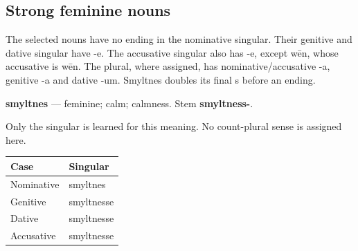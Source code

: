 \subsection*{Strong feminine nouns}

The selected nouns have no ending in the nominative singular. Their genitive and dative singular have -e. The accusative singular also has -e, except wēn, whose accusative is wēn. The plural, where assigned, has nominative/\allowbreak{}accusative -a, genitive -a and dative -um. Smyltnes doubles its final s before an ending.

\par\begin{minipage}{\linewidth}\raggedright
\textbf{smyltnes} — feminine; calm; calmness. Stem \textbf{smyltness-}.

Only the singular is learned for this meaning. No count-plural sense is assigned here.

\par\begingroup
\fontsize{10.5}{13.2}\selectfont
\setlength{\LTleft}{0pt}\setlength{\LTright}{\fill}
\noindent
\begin{tabular}{@{}>{\raggedright\arraybackslash}p{60.59mm}>{\raggedright\arraybackslash}p{60.59mm}@{}}
\toprule
\textbf{Case} & \textbf{Singular} \\
\midrule
Nominative & smyltnes \\
Genitive & smyltnesse \\
Dative & smyltnesse \\
Accusative & smyltnesse \\
\bottomrule
\end{tabular}
\par\endgroup

\end{minipage}\par
